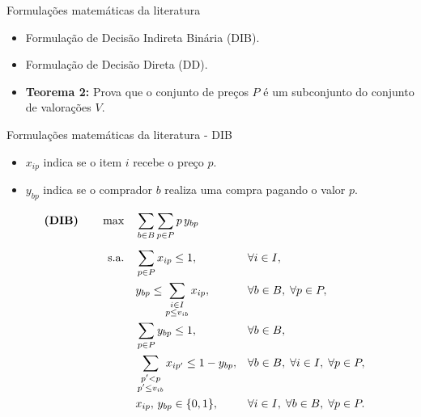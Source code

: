 \documentclass{beamer}
\begin{document}
\begin{frame}{Formulações matemáticas da literatura}

    \begin{itemize}
        \item Formulação de Decisão Indireta Binária (DIB).
        \item Formulação de Decisão Direta (DD).
        \pause
        \item \textbf{Teorema 2:} Prova que o conjunto de preços $P$ é um subconjunto do conjunto de valorações $V$.
    \end{itemize}

\end{frame}

\begin{frame}[shrink]{Formulações matemáticas da literatura - DIB}

    \begin{itemize}
        \item $x_{ip}$ indica se o item $i$ recebe o preço $p$.
        \item $y_{bp}$ indica se o comprador $b$ realiza uma compra pagando o valor $p$.
    \end{itemize}
    \pause
    \footnotesize

    \begin{align}
    \textbf{(DIB)}\qquad
    \max\quad & \sum_{b\in B}\sum_{p\in P} p\,y_{bp} \notag\\[0.4em]
    \text{s.a.}\quad
    &\sum_{p\in P}x_{ip}\le1, && \forall i\in I, \label{eq:dib1}\\
    &y_{bp}\le \sum_{\substack{i\in I\\ p\le v_{ib}}}x_{ip}, && \forall b\in B,\; \forall p\in P, \label{eq:dib2}\\
    &\sum_{p\in P}y_{bp}\le1, && \forall b \in B, \label{eq:dib3}\\
    &\sum_{\substack{p'<p\\ p'\le v_{ib}}} x_{ip'} \le 1-y_{bp}, && \forall b\in B,\; \forall i\in I,\; \forall p\in P, \label{eq:dib4}\\
    &x_{ip},\,y_{bp}\in\{0,1\}, && \forall i\in I,\; \forall b\in B,\; \forall p\in P. \label{eq:dib5}
    \end{align}


\end{frame}
\end{document}
